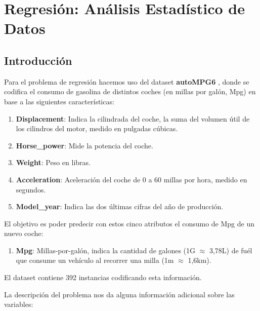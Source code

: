 \section{Regresión: Análisis Estadístico de Datos}

\subsection{Introducción}

Para el problema de regresión hacemos uso del dataset \textbf{autoMPG6} \cite{autompg}, donde se codifica el consumo de gasolina de distintos coches (en millas por galón, Mpg) en base a las siguientes características:

\begin{enumerate}
\def\labelenumi{\arabic{enumi}.}
    \item \textbf{Displacement}: Indica la cilindrada del coche, la suma del volumen útil de los cilindros del motor, medido en pulgadas cúbicas.
    \item \textbf{Horse\_power}: Mide la potencia del coche.
    \item \textbf{Weight}: Peso en libras.
    \item \textbf{Acceleration}: Aceleración del coche de 0 a 60 millas por hora, medido
    en segundos.
    \item \textbf{Model\_year}: Indica las dos últimas cifras del año de producción.
\end{enumerate}

El objetivo es poder predecir con estos cinco atributos el consumo de Mpg de un nuevo coche:

\begin{enumerate}
    \def\labelenumi{\arabic{enumi}.}
    \setcounter{enumi}{5}
    \item \textbf{Mpg}: Millas-por-galón, indica la cantidad de galones (1G $\approx$ 3,78L) de fuél que consume un vehículo al recorrer una milla (1m $\approx$ 1,6km).
\end{enumerate}

El dataset contiene 392 instancias codificando esta información.

\vspace{\baselineskip}

La descripción del problema nos da alguna información adicional sobre las variables:

